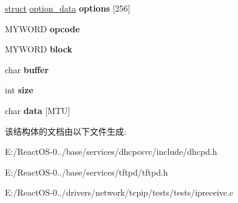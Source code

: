 \begin{DoxyCompactItemize}
\hyperlink{interfacestruct}{struct} \hyperlink{structoption__data}{option\+\_\+data} {\bfseries options} \mbox{[}256\mbox{]}
\item 
\mbox{\label{structpacket_af424bf492795781a3e9dcc912613e4ea}} 
M\+Y\+W\+O\+RD {\bfseries opcode}
\item 
\mbox{\label{structpacket_af62dde95334ec7d6332f2f971de7c4a6}} 
M\+Y\+W\+O\+RD {\bfseries block}
\item 
\mbox{\label{structpacket_a872a1f32fa6cfb2a0864bd82657005c7}} 
char {\bfseries buffer}
\item 
\mbox{\label{structpacket_a1059b3020da834ede19467ddc997f153}} 
int {\bfseries size}
\item 
\mbox{\label{structpacket_a3b268d0c9082881ee50895681397e618}} 
char {\bfseries data} \mbox{[}M\+TU\mbox{]}
\end{DoxyCompactItemize}


该结构体的文档由以下文件生成\+:\begin{DoxyCompactItemize}
\item 
E\+:/\+React\+O\+S-\/0../base/services/dhcpcsvc/include/dhcpd.\+h\item 
E\+:/\+React\+O\+S-\/0../base/services/tftpd/tftpd.\+h\item 
E\+:/\+React\+O\+S-\/0../drivers/network/tcpip/tests/tests/ipreceive.\+c\end{DoxyCompactItemize}
